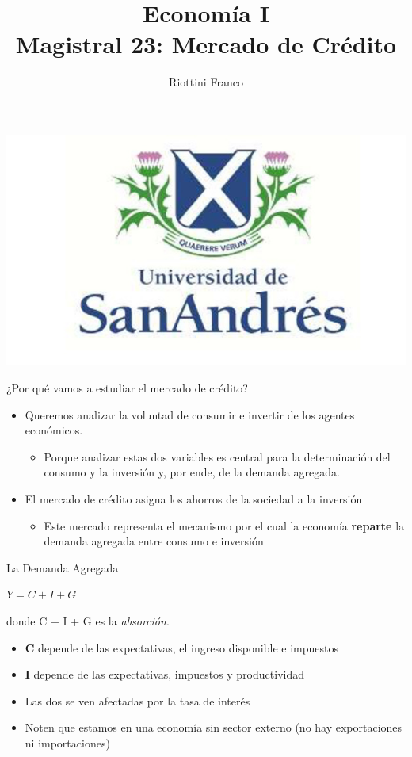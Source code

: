 \documentclass{beamer}
\title[Economía I]{Economía I \vspace{4mm}
\\ Magistral 23: Mercado de Crédito}
\date{}
\author[Riottini]{Riottini Franco}
\institute[]{Universidad de San Andrés}
\begin{document}
\begin{frame}
\titlepage
\centering

\includegraphics[scale=0.2]{../Figures/logoUDESA.jpg} 
\end{frame}

\begin{frame}{¿Por qué vamos a estudiar el mercado de crédito?}
    \begin{itemize}
        \item Queremos analizar la voluntad de consumir e invertir de los agentes económicos.
        \begin{itemize}
            \item Porque analizar estas dos variables es central para la determinación del consumo y la inversión y, por ende, de la demanda agregada. 
        \end{itemize}
        \item El mercado de crédito asigna los ahorros de la sociedad a la inversión
        \begin{itemize}
            \item Este mercado representa el mecanismo por el cual la economía \textbf{reparte} la demanda agregada entre consumo e inversión
        \end{itemize}
    \end{itemize}
\end{frame}

\begin{frame}{La Demanda Agregada}
    \begin{center}
        \(Y = C + I + G\) 
    \end{center}
    donde C + I + G es la \textit{absorción}.
    \begin{itemize}
            \item \textbf{C} depende de las expectativas, el ingreso disponible e impuestos
            \item \textbf{I} depende de las expectativas, impuestos y productividad
            \item Las dos se ven afectadas por la tasa de interés
            \item Noten que estamos en una economía sin sector externo (no hay exportaciones ni importaciones)
    \end{itemize}
\end{frame}
\end{document}
